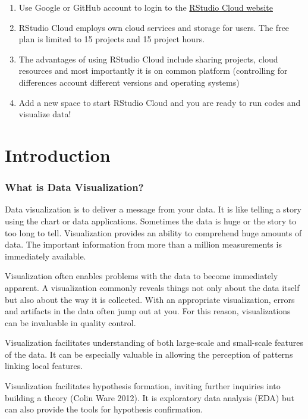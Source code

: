 \documentclass[
]{book}
\providecommand{\tightlist}{%
  \setlength{\itemsep}{0pt}\setlength{\parskip}{0pt}}
\begin{document}
\begin{enumerate}
\def\labelenumi{\arabic{enumi}.}
\tightlist
\item
  Use Google or GitHub account to login to the \href{http://Rstudio.cloud}{RStudio Cloud website}
\item
  RStudio Cloud employs own cloud services and storage for users. The free plan is limited to 15 projects and 15 project hours.
\item
  The advantages of using RStudio Cloud include sharing projects, cloud resources and most importantly it is on common platform (controlling for differences account different versions and operating systems)
\item
  Add a new space to start RStudio Cloud and you are ready to run codes and visualize data!
\end{enumerate}

\hypertarget{intro}{%
\chapter{Introduction}\label{intro}}

\hypertarget{what-is-data-visualization}{%
\subsection{What is Data Visualization?}\label{what-is-data-visualization}}

Data visualization is to deliver a message from your data. It is like telling a story using the chart or data applications. Sometimes the data is huge or the story to too long to tell. Visualization provides an ability to comprehend huge amounts of data. The important information from more than a million measurements is immediately available.

Visualization often enables problems with the data to become immediately apparent. A visualization commonly reveals things not only about the data itself but also about the way it is collected. With an appropriate visualization, errors and artifacts in the data often jump out at you. For this reason, visualizations can be invaluable in quality control.

Visualization facilitates understanding of both large-scale and small-scale features of the data. It can be especially valuable in allowing the perception of patterns linking local features.

Visualization facilitates hypothesis formation, inviting further inquiries into building a theory (Colin Ware 2012). It is exploratory data analysis (EDA) but can also provide the tools for hypothesis confirmation.
\end{document}
